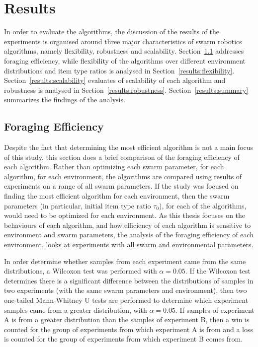 \chapter{Results}
\label{chap:results}

In order to evaluate the algorithms, the discussion of the results of the experiments is organised around three major characteristics of swarm robotics algorithms, namely flexibility, robustness and scalability. Section~\ref{results:efficiency} addresses foraging efficiency, while flexibility of the algorithms over different environment distributions and item type ratios is analysed in Section~\ref{results:flexibility}. Section~\ref{results:scalability} evaluates of scalability of each algorithm and robustness is analysed in Section~\ref{results:robustness}. Section~\ref{results:summary} summarizes the findings of the analysis.

\section{Foraging Efficiency}
\label{results:efficiency}

Despite the fact that determining the most efficient algorithm is not a main focus of this study, this section does a brief comparison of the foraging efficiency of each algorithm. Rather than optimizing each swarm parameter, for each algorithm, for each environment, the algorithms are compared using results of experiments on a range of all swarm parameters. If the study was focused on finding the most efficient algorithm for each environment, then the swarm parameters (in particular, initial item type ratio $\tau_0$), for each of the algorithms, would need to be optimized for each environment. As this thesis focuses on the behaviours of each algorithm, and how efficiency of each algorithm is sensitive to environment and swarm parameters, the analysis of the foraging efficiency of each environment, looks at experiments with all swarm and environmental parameters.

In order determine whether samples from each experiment came from the same distributions, a Wilcoxon test was performed with $\alpha=0.05$. If the Wilcoxon test determines there is a significant difference between the distributions of samples in two experiments (with the same swarm parameters and environment), then two one-tailed Mann-Whitney U tests are performed to determine which experiment samples came from a greater distribution, with $\alpha=0.05$. If samples of experiment A is from a greater distribution than the samples of experiment B, then a win is counted for the group of experiments from which experiment A is from and a loss is counted for the group of experiments from which experiment B comes from.

